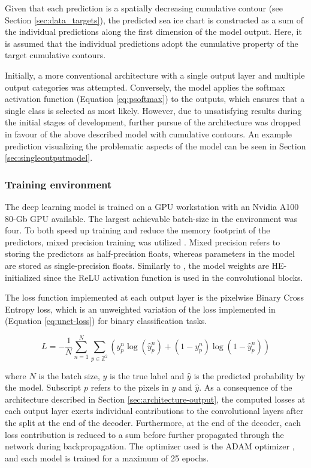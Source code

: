 \documentclass[../main/thesis]{subfiles}
\begin{document}
Given that each prediction is a spatially decreasing cumulative contour (see Section \ref{sec:data_targets}), the predicted sea ice chart is constructed as a sum of the individual predictions along the first dimension of the model output. Here, it is assumed that the individual predictions adopt the cumulative property of the target cumulative contours. 

Initially, a more conventional architecture with a single output layer and multiple output categories \citep{Ronneberger2015} was attempted. Conversely, the model applies the softmax activation function (Equation \ref{eq:psoftmax}) to the outputs, which ensures that a single class is selected as most likely. However, due to unsatisfying results during the initial stages of development, further pursue of the architecture was dropped in favour of the above described model with cumulative contours. An example prediction visualizing the problematic aspects of the model can be seen in Section \ref{sec:singleoutputmodel}. 

\subsubsection{Training environment}
\label{sec:train_env}
The deep learning model is trained on a GPU workstation with an Nvidia A100 80-Gb GPU available. The largest achievable batch-size in the environment was four. To both speed up training and reduce the memory footprint of the predictors, mixed precision training was utilized \citep{Micikevicius2017}. Mixed precision refers to storing the predictors as half-precision floats, whereas parameters in the model are stored as single-precision floats. Similarly to \citet{Ronneberger2015}, the model weights are HE-initialized \citep{He2015} since the ReLU activation function \citep{Nair2010} is used in the convolutional blocks.

The loss function implemented at each output layer is the pixelwise Binary Cross Entropy loss, which is an unweighted variation of the loss implemented in \citet{Ronneberger2015} (Equation \ref{eq:unet-loss}) for binary classification tasks. 

\begin{equation}
    \label{eq:loss}
    L = -\frac{1}{N}\sum_{n = 1}^N\sum_{p \in \mathbb{Z}^2}\left(y_p^n\log{(\hat{y}_p^n)} + \left(1 - y_p^n\right)\log{(1 - \hat{y}_p^n)}\right)
\end{equation}

where $N$ is the batch size, $y$ is the true label and $\hat{y}$ is the predicted probability by the model. Subscript $p$ refers to the pixels in $y$ and $\hat{y}$. As a consequence of the architecture described in Section \ref{sec:architecture-output}, the computed losses at each output layer exerts individual contributions to the convolutional layers after the split at the end of the decoder. Furthermore, at the end of the decoder, each loss contribution is reduced to a sum before further propagated through the network during backpropagation. The optimizer used is the ADAM optimizer \citep{Kingma2014}, and each model is trained for a maximum of 25 epochs.
\end{document}
